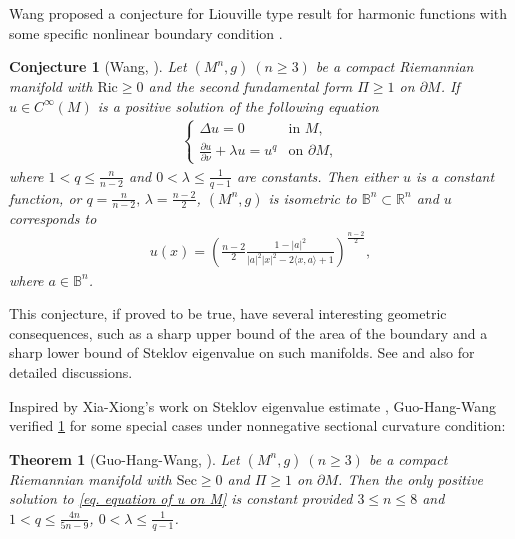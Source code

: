 \documentclass[12pt]{amsart}
\newtheorem{theorem}{Theorem}
\newtheorem{conjecture}{Conjecture}
\numberwithin{equation}{section}
\numberwithin{lemma}{section}
\numberwithin{proposition}{section}
\numberwithin{corollary}{section}
\numberwithin{remark}{section}
\begin{document}
Wang proposed a conjecture for Liouville type result for harmonic functions with some specific nonlinear boundary condition \cite[Conjecture 1]{Wan21}.  
\begin{conjecture}[Wang, \cite{Wan21}]\label{conj. Wang}
    Let $(M^n,g)\ (n\geq 3)$ be a compact Riemannian manifold with $\mathrm{Ric}\geq 0$ and the second fundamental form $\Pi\geq 1$ on $\partial M$. If $u\in C^{\infty}(M)$ is a positive solution of the following equation
    \begin{align}\label{eq. equation of u on M}
        \begin{cases}
            \Delta u=0  &\text{in }M,\\
            \frac{\partial u}{\partial \nu}+\lambda u=u^q &\text{on }\partial M,
        \end{cases}
    \end{align}
    where $1<q\leq \frac{n}{n-2}$ and $0<\lambda\leq \frac{1}{q-1}$ are constants. Then either $u$ is a constant function, or $q=\frac{n}{n-2},\, \lambda=\frac{n-2}{2}$, $(M^n,g)$ is isometric to $\mathbb{B}^n\subset\mathbb{R}^n$ and $u$ corresponds to
    \begin{align*}
            u(x)=\left(
            \frac{n-2}{2}\frac{1-|a|^2}{|a|^2|x|^2-2\langle x,a\rangle+1}
            \right)^{\frac{n-2}{2}},
        \end{align*}
        where $a\in \mathbb{B}^n$.
\end{conjecture}
This conjecture, if proved to be true, have several interesting geometric consequences, such as a sharp upper bound of the area of the boundary and a sharp lower bound of Steklov eigenvalue on such manifolds. See \cite[Section 2]{Wan21} and also \cite[Section 5]{GHW21} for detailed discussions.

Inspired by Xia-Xiong's work on Steklov eigenvalue estimate \cite{XX24}, Guo-Hang-Wang \cite[Theorem 2]{GHW21} verified \cref{conj. Wang} for some special cases under nonnegative sectional curvature condition:
\begin{theorem}[Guo-Hang-Wang, \cite{GHW21}]\label{thm. GHW21}
    Let $(M^n,g)\ (n\geq 3)$ be a compact Riemannian manifold with $\mathrm{Sec}\geq 0$ and $\Pi\geq 1$ on $\partial M$. Then the only positive solution to \cref{eq. equation of u on M} is constant provided $3\leq n\leq 8$ and 
    $1<q\leq \frac{4n}{5n-9}$, $0<\lambda\leq \frac{1}{q-1}$.
\end{theorem}
\end{document}
